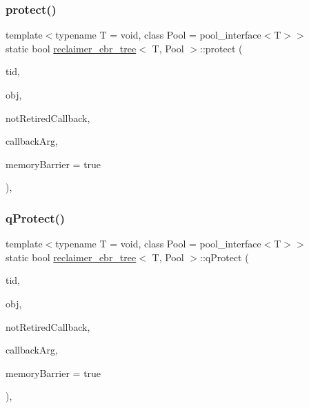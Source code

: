 \subsubsection{\texorpdfstring{protect()}{protect()}}
{\footnotesize\ttfamily template$<$typename T  = void, class Pool  = pool\+\_\+interface$<$\+T$>$$>$ \\
static bool \hyperlink{classreclaimer__ebr__tree}{reclaimer\+\_\+ebr\+\_\+tree}$<$ T, Pool $>$\+::protect (\begin{DoxyParamCaption}\item[{const int}]{tid,  }\item[{T $\ast$const}]{obj,  }\item[{\hyperlink{globals_8h_a57f5c0d40b156d7d996492fb2f16e3cd}{Callback\+Type}}]{not\+Retired\+Callback,  }\item[{\hyperlink{globals_8h_a3de64ef48066ac6430631c8b81a15345}{Callback\+Arg}}]{callback\+Arg,  }\item[{bool}]{memory\+Barrier = {\ttfamily true} }\end{DoxyParamCaption})\hspace{0.3cm}{\ttfamily [inline]}, {\ttfamily [static]}}

\mbox{\label{classreclaimer__ebr__tree_a56fe1802d92cd833480d75cc249f1199}} 
\subsubsection{\texorpdfstring{q\+Protect()}{qProtect()}}
{\footnotesize\ttfamily template$<$typename T  = void, class Pool  = pool\+\_\+interface$<$\+T$>$$>$ \\
static bool \hyperlink{classreclaimer__ebr__tree}{reclaimer\+\_\+ebr\+\_\+tree}$<$ T, Pool $>$\+::q\+Protect (\begin{DoxyParamCaption}\item[{const int}]{tid,  }\item[{T $\ast$const}]{obj,  }\item[{\hyperlink{globals_8h_a57f5c0d40b156d7d996492fb2f16e3cd}{Callback\+Type}}]{not\+Retired\+Callback,  }\item[{\hyperlink{globals_8h_a3de64ef48066ac6430631c8b81a15345}{Callback\+Arg}}]{callback\+Arg,  }\item[{bool}]{memory\+Barrier = {\ttfamily true} }\end{DoxyParamCaption})\hspace{0.3cm}{\ttfamily [inline]}, {\ttfamily [static]}}

